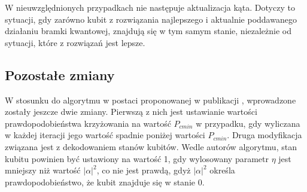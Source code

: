 W nieuwzględnionych przypadkach nie następuje aktualizacja kąta. Dotyczy to sytuacji, gdy zarówno kubit z rozwiązania najlepszego i aktualnie poddawanego działaniu bramki kwantowej, znajdują się w tym samym stanie, niezależnie od sytuacji, które z rozwiązań jest lepsze.

\subsection{Pozostałe zmiany}
W stosunku do algorytmu w postaci proponowanej w publikacji \cite{NPQGA}, wprowadzone zostały jeszcze dwie zmiany. Pierwszą z nich jest ustawianie wartości prawdopodobieństwa krzyżowania na wartość $P_{c min}$ w przypadku, gdy wyliczana w każdej iteracji jego wartość spadnie poniżej wartości $P_{c min}$. Druga modyfikacja związana jest z dekodowaniem stanów kubitów. Wedle autorów algorytmu, stan kubitu powinien być ustawiony na wartość 1, gdy wylosowany parametr $\eta$ jest mniejszy niż wartość $|\alpha|^2$, co nie jest prawdą, gdyż $|\alpha|^2$ określa prawdopodobieństwo, że kubit znajduje się w stanie 0.
